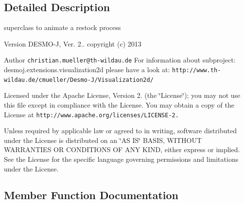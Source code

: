 \subsection{Detailed Description}
superclass to animate a restock process

\begin{DoxyVersion}{Version}
D\-E\-S\-M\-O-\/\-J, Ver. 2.. copyright (c) 2013 
\end{DoxyVersion}
\begin{DoxyAuthor}{Author}
{\tt christian.\-mueller@th-\/wildau.\-de} For information about subproject\-: desmoj.\-extensions.\-visualization2d please have a look at\-: {\tt http\-://www.\-th-\/wildau.\-de/cmueller/\-Desmo-\/\-J/\-Visualization2d/}
\end{DoxyAuthor}
Licensed under the Apache License, Version 2. (the \char`\"{}\-License\char`\"{}); you may not use this file except in compliance with the License. You may obtain a copy of the License at {\tt http\-://www.\-apache.\-org/licenses/\-L\-I\-C\-E\-N\-S\-E-\/2.}

Unless required by applicable law or agreed to in writing, software distributed under the License is distributed on an \char`\"{}\-A\-S I\-S\char`\"{} B\-A\-S\-I\-S, W\-I\-T\-H\-O\-U\-T W\-A\-R\-R\-A\-N\-T\-I\-E\-S O\-R C\-O\-N\-D\-I\-T\-I\-O\-N\-S O\-F A\-N\-Y K\-I\-N\-D, either express or implied. See the License for the specific language governing permissions and limitations under the License. 

\subsection{Member Function Documentation}
